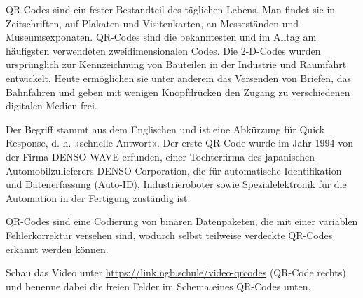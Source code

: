 \documentclass[11pt, a4paper, ngerman]{arbeitsblatt}
\begin{document}
\ReiheTitel

QR-Codes sind ein fester Bestandteil des täglichen Lebens. Man findet sie in
Zeitschriften, auf Plakaten und Visitenkarten, an Messeständen und
Museumsexponaten. QR-Codes sind die bekanntesten und im Alltag am häufigsten
verwendeten zweidimensionalen Codes. Die 2-D-Codes wurden ursprünglich zur
Kennzeichnung von Bauteilen in der Industrie und Raumfahrt entwickelt. Heute
ermöglichen sie unter anderem das Versenden von Briefen, das Bahnfahren und
geben mit wenigen Knopfdrücken den Zugang zu verschiedenen digitalen Medien
frei.

Der Begriff stammt aus dem Englischen und ist eine Abkürzung für Quick
Response, d. h. »schnelle Antwort«. Der erste QR-Code wurde im Jahr 1994 von
der Firma DENSO WAVE erfunden, einer Tochterfirma des japanischen
Automobilzulieferers DENSO Corporation, die für automatische Identifikation und
Datenerfassung (Auto-ID), Industrieroboter sowie Spezialelektronik für die
Automation in der Fertigung zuständig ist.

QR-Codes sind eine Codierung von binären Datenpaketen, die mit einer variablen
Fehlerkorrektur versehen sind, wodurch selbst teilweise verdeckte QR-Codes
erkannt werden können.

\begin{links}[.89]
\begin{aufgabe}
	Schau das Video unter \url{https://link.ngb.schule/video-qrcodes} (QR-Code
	rechts) und benenne dabei die freien Felder im Schema eines QR-Codes unten.
\end{aufgabe}
\end{links}\begin{rechts}[.09]
\end{rechts}
\end{document}
